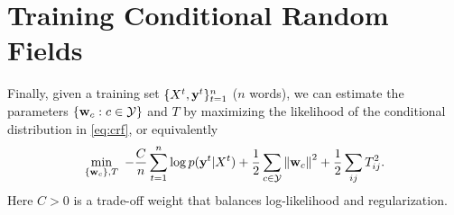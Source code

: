 \documentclass[11pt]{report}
\begin{document}
\section{Training Conditional Random Fields}

Finally, given a training set $\{X^t, \mathbf{\boldsymbol{y}}^t\}_{t=1}^n$ ($n$ words),
we can estimate the parameters $\{\mathbf{\boldsymbol{w}}_c : c \in \mathcal{Y}\}$ and $T$ by maximizing the likelihood of the conditional distribution in \eqref{eq:crf}, or equivalently
\begin{align}
	\label{eq:obj_MLE}
	\min_{\{\mathbf{\boldsymbol{w}}_c\}, T} \ -\frac{C}{n}\sum_{t=1}^n \log p(\mathbf{\boldsymbol{y}}^t | X^t) 
	+ \frac{1}{2} \sum_{c \in \mathcal{Y}} \left\|\mathbf{\boldsymbol{w}}_c\right\|^2 
	+ \frac{1}{2} \sum_{ij} T^2_{ij}.
\end{align}
Here $C > 0$ is a trade-off weight that balances log-likelihood and regularization.
\end{document}
